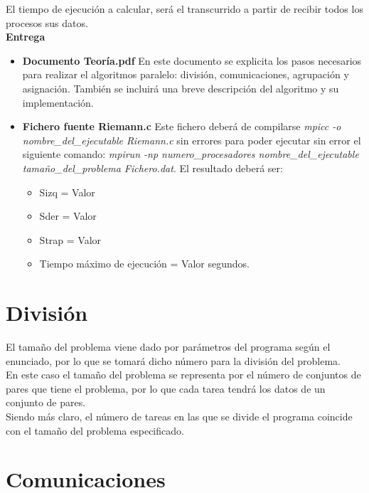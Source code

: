 \newpage \documentclass[a4paper,10pt]{article}
\begin{document}
El tiempo de ejecución a calcular, será el transcurrido a partir de recibir todos los procesos sus datos.\\

\textbf{Entrega}

\begin{itemize}
\item \textbf{Documento Teoría.pdf} En este documento se explicita los pasos necesarios para realizar el algoritmos paralelo: división, comunicaciones, agrupación y asignación. También se incluirá una breve descripción del algoritmo y su implementación.

\item \textbf{Fichero fuente Riemann.c}  Este fichero deberá de compilarse \textit{mpicc -o nombre\_del\_ejecutable Riemann.c}  sin errores para poder ejecutar sin error el siguiente comando: \textit{mpirun -np numero\_procesadores nombre\_del\_ejecutable tamaño\_del\_problema Fichero.dat}. El resultado deberá ser:
\begin{itemize}
\item Sizq = Valor
\item Sder = Valor
\item Strap = Valor
\item Tiempo máximo de ejecución = Valor segundos.
\end{itemize}

\end{itemize}

\section{División}

El tamaño del problema viene dado por parámetros del programa según el enunciado, por lo que se tomará dicho número para la división del problema.\\

En este caso el tamaño del problema se representa por el número de conjuntos de pares que tiene el problema, por lo que cada tarea tendrá los datos de un conjunto de pares.\\

Siendo más claro, el número de tareas en las que se divide el programa coincide con el tamaño del problema especificado.\\

\section{Comunicaciones}
\end{document}
